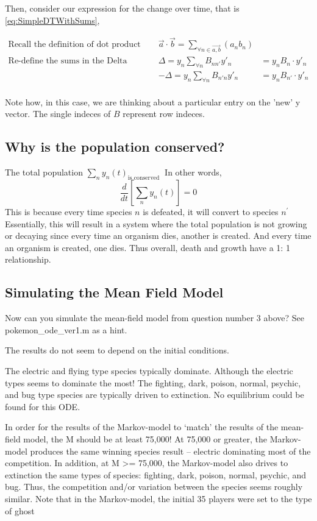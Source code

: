 \documentclass[border=1pt]{article}
\begin{document}
Then, consider our expression for the change over time, that is \autoref{eq:SimpleDTWithSums}, 

\begin{eqnarray}
	\text{Recall the definition of dot product}& \vec{a} \cdot \vec{b}=\sum_{\forall n \in \vec{a, b}}(a_n b_n)\\
	\text{Re-define the sums in the Delta Equations} & \Delta = y_n \sum_{\forall n} B_{nn'}y'_n & =y_n B_n \cdot y'_n\\
	&-\Delta = y_n \sum_{\forall n} B_{n'n} y'_n & =y_n B_{n'} \cdot y'_n\\
\end{eqnarray}

Note how, in this case, we are thinking about a particular entry on the 'new' y vector. The single indeces of $B$ represent row indeces. 

\subsection{Why is the population conserved?}
The total population $\sum_{n} y_{n}(t)_{\text {is conserved }}$ In other words, 
\begin{equation}
\frac{d}{d t}\left[\sum_{n} y_{n}(t)\right]=0
\end{equation}
This is because every time species $n$ is defeated, it will convert to species $n^{\prime }$ Essentially, this will result in a system where the total population is not growing or decaying since every time an organism dies, another is created. And every time an organism is created, one dies. Thus overall, death and growth have a 1: 1 relationship.

\subsection{Simulating the Mean Field Model}
Now can you simulate the mean-field model from question number 3 above? See
pokemon\_ode\_ver1.m as a hint. 

The results do not seem to depend on the initial conditions. 

The electric and flying type species typically dominate. Although the electric types seems to dominate the most! The fighting, dark, poison, normal, psychic, and bug type species are typically driven to extinction. No equilibrium could be found for this ODE. 

In order for the results of the Markov-model to ‘match’ the results of the mean-field model, the M should be at least 75,000! At 75,000 or greater, the Markov-model produces the same winning species result – electric dominating most of the competition. In addition, at M >= 75,000, the Markov-model also drives to extinction the same types of species: fighting, dark, poison, normal, psychic, and bug. Thus, the competition and/or variation between the species seems roughly similar. Note that in the Markov-model, the initial 35 players were set to the type of ghost
\end{document}
